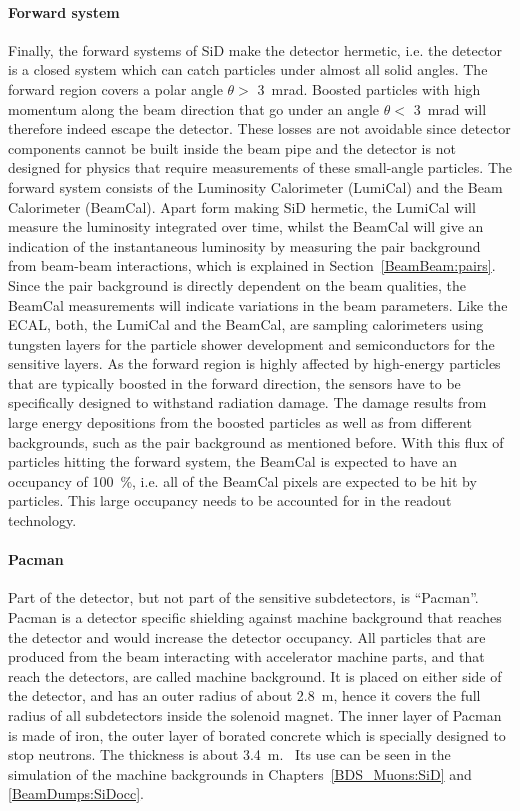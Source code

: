 \paragraph{Forward system}
Finally, the forward systems of SiD make the detector hermetic, i.e. the detector is a closed system which can catch particles under almost all solid angles.
The forward region covers a polar angle $\theta > $ \SI{3}{\milli\radian}.
Boosted particles with high momentum along the beam direction that go under an angle $\theta < $ \SI{3}{\milli\radian} will therefore indeed escape the detector.
These losses are not avoidable since detector components cannot be built inside the beam pipe and the detector is not designed for physics that require measurements of these small-angle particles.
The forward system consists of the Luminosity Calorimeter (LumiCal) and the Beam Calorimeter (BeamCal).
Apart form making SiD hermetic, the LumiCal will measure the luminosity integrated over time, whilst the BeamCal will give an indication of the instantaneous luminosity by measuring the \positron \electron pair background from beam-beam interactions, which is explained in Section~\ref{BeamBeam:pairs}.
Since the pair background is directly dependent on the beam qualities, the BeamCal measurements will indicate variations in the beam parameters.
Like the ECAL, both, the LumiCal and the BeamCal, are sampling calorimeters using tungsten layers for the particle shower development and semiconductors for the sensitive layers.
As the forward region is highly affected by high-energy particles that are typically boosted in the forward direction, the sensors have to be specifically designed to withstand radiation damage.
The damage results from large energy depositions from the boosted particles as well as from different backgrounds, such as the pair background as mentioned before.
With this flux of particles hitting the forward system, the BeamCal is expected to have an occupancy of \SI{100}{\percent}, i.e. all of the BeamCal pixels are expected to be hit by particles.
This large occupancy needs to be accounted for in the readout technology.~\cite[p. 133ff]{TDR4}
\paragraph{Pacman}
Part of the detector, but not part of the sensitive subdetectors, is ``Pacman''.
Pacman is a detector specific shielding against machine background that reaches the detector and would increase the detector occupancy.
All particles that are produced from the beam interacting with accelerator machine parts, and that reach the detectors, are called machine background.
It is placed on either side of the detector, and has an outer radius of about \SI{2.8}{\meter}, hence it covers the full radius of all subdetectors inside the solenoid magnet.
The inner layer of Pacman is made of iron, the outer layer of borated concrete which is specially designed to stop neutrons.
The thickness is about \SI{3.4}{\meter}.~\cite{SiD_Geo}
Its use can be seen in the simulation of the machine backgrounds in Chapters~\ref{BDS_Muons:SiD} and \ref{BeamDumps:SiDocc}.

